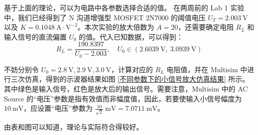 \documentclass[UTF8]{report}
\def\mV{\ \mathrm{mV}}
\theoremstyle{MyLineTheoremStyle} %
\theoremstyle{MyBlockTheoremStyle} %
\theoremstyle{MySubsubsectionStyle} %
\begin{document}
基于上面的理论，可以为电路中各参数选择合适的值。
在两周前的 Lab 1 实验中，我们已经得到了 N 沟道增强型 MOSFET 2N7000 的阈值电压 $U_T = 2.003 \ \mathrm{V}$ 以及 $K = 0.1048 \ \mathrm{A\cdot V^{-2}}$。本次实验的放大倍数为 $A = 20$，还需要确定电阻 $R_L$ 和输入信号的直流偏置 $U_0$ 的值。代入已知数据，可以得到：
\begin{equation}
R_L = \frac{190.8397}{U_0 - 2.003},\quad U_0 \in \left(2.6039 \ \mathrm{V},\  3.0939 \ \mathrm{V}\right)
\end{equation}

不妨分别令 $U_0 = 2.8 \ \mathrm{V}, 2.9 \ \mathrm{V}, 3.0 \ \mathrm{V}$，计算对应的 $R_L$ 电阻值，并在 Multisim 中进行三次仿真，得到的示波器结果如图 \ref{不同参数下的小信号放大仿真结果} 所示。其中绿色是输入信号，红色是放大后的输出信号。需要注意，Multisim 中的 AC Source 的“电压”参数是指有效值而非幅度值，因此，若要使输入小信号幅度为 $10 \mV$，应设置“电压”参数为 $\frac{10}{\sqrt{2}} \mV = 7.0711 \mV$。

由表和图可以知道，理论与实际符合得较好。
\end{document}
